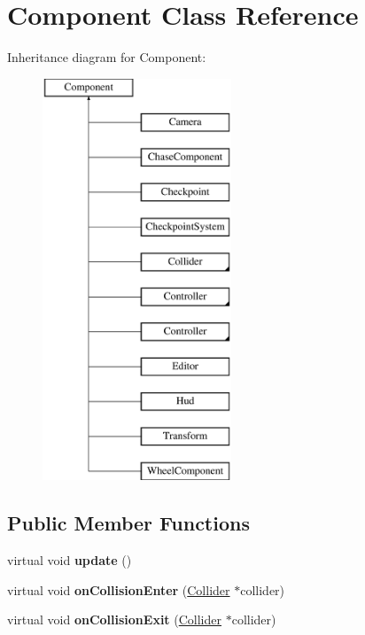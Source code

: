 \hypertarget{class_component}{\section{Component Class Reference}
\label{class_component}
}
Inheritance diagram for Component\-:\begin{figure}[H]
\begin{center}
\leavevmode
\includegraphics[height=12.000000cm]{class_component}
\end{center}
\end{figure}
\subsection*{Public Member Functions}
\begin{DoxyCompactItemize}
\item 
\hypertarget{class_component_a2c9d95ea989f2d69381ad9b6728b51ae}{virtual void {\bfseries update} ()}\label{class_component_a2c9d95ea989f2d69381ad9b6728b51ae}

\item 
\hypertarget{class_component_aa769935b0fa6ba03042edfb8ebefecb7}{virtual void {\bfseries on\-Collision\-Enter} (\hyperlink{class_collider}{Collider} $\ast$collider)}\label{class_component_aa769935b0fa6ba03042edfb8ebefecb7}

\item 
\hypertarget{class_component_ad88044bb68211129cb7675b978f6030a}{virtual void {\bfseries on\-Collision\-Exit} (\hyperlink{class_collider}{Collider} $\ast$collider)}\label{class_component_ad88044bb68211129cb7675b978f6030a}

\end{DoxyCompactItemize}
